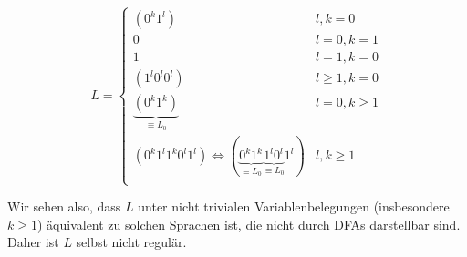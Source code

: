 \begin{enumerate}[a)]
\[ L=
\begin{cases}
(0^k 1^l) & l,k = 0 \\
            0 & l = 0, k=1 \\
            1 & l = 1, k=0 \\
(1^l 0^l 0^l) & l \geq 1, k=0 \\
    \underbrace{(0^k 1^k)}_{\equiv L_0} & l=0, k \geq 1 \\
(0^k 1^l 1^k 0^l 1^l) \iff (\underbrace{0^k 1^k}_{\equiv L_0} \underbrace{1^l 0^l}_{\equiv L_0} 1^l) & l,k \geq 1 \\
\end{cases}
\]

Wir sehen also, dass $L$ unter nicht trivialen Variablenbelegungen (insbesondere $k \geq 1$) äquivalent zu solchen Sprachen ist, die nicht durch DFAs darstellbar sind. Daher ist $L$ selbst nicht regulär.


\end{enumerate}





















